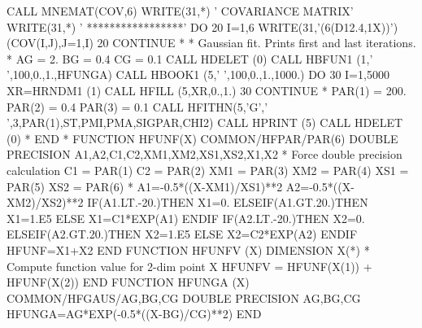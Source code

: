 \begin{XMP}
      CALL MNEMAT(COV,6)
      WRITE(31,*) ' COVARIANCE MATRIX'
      WRITE(31,*) ' *****************'
      DO 20 I=1,6
        WRITE(31,'(6(D12.4,1X))') (COV(I,J),J=1,I)
   20 CONTINUE
*
*       Gaussian fit. Prints first and last iterations.
*
      AG = 2.
      BG = 0.4
      CG = 0.1
      CALL HDELET (0)
      CALL HBFUN1 (1,' ',100,0.,1.,HFUNGA)
      CALL HBOOK1 (5,' ',100,0.,1.,1000.)
      DO 30 I=1,5000
         XR=HRNDM1 (1)
         CALL HFILL (5,XR,0.,1.)
   30 CONTINUE
*
      PAR(1) = 200.
      PAR(2) = 0.4
      PAR(3) = 0.1
      CALL HFITHN(5,'G',' ',3,PAR(1),ST,PMI,PMA,SIGPAR,CHI2)
      CALL HPRINT (5)
      CALL HDELET (0)
*
      END
*
      FUNCTION HFUNF(X)
      COMMON/HFPAR/PAR(6)
      DOUBLE PRECISION A1,A2,C1,C2,XM1,XM2,XS1,XS2,X1,X2
*       Force double precision calculation
      C1  = PAR(1)
      C2  = PAR(2)
      XM1 = PAR(3)
      XM2 = PAR(4)
      XS1 = PAR(5)
      XS2 = PAR(6)
*
      A1=-0.5*((X-XM1)/XS1)**2
      A2=-0.5*((X-XM2)/XS2)**2
      IF(A1.LT.-20.)THEN
         X1=0.
      ELSEIF(A1.GT.20.)THEN
         X1=1.E5
      ELSE
         X1=C1*EXP(A1)
      ENDIF
      IF(A2.LT.-20.)THEN
         X2=0.
      ELSEIF(A2.GT.20.)THEN
         X2=1.E5
      ELSE
         X2=C2*EXP(A2)
      ENDIF
      HFUNF=X1+X2
      END
      FUNCTION HFUNFV (X)
      DIMENSION X(*)
*         Compute function value for 2-dim point X
      HFUNFV = HFUNF(X(1)) + HFUNF(X(2))
      END
      FUNCTION HFUNGA (X)
      COMMON/HFGAUS/AG,BG,CG
      DOUBLE PRECISION AG,BG,CG
      HFUNGA=AG*EXP(-0.5*((X-BG)/CG)**2)
      END
\end{XMP}
\newpage
